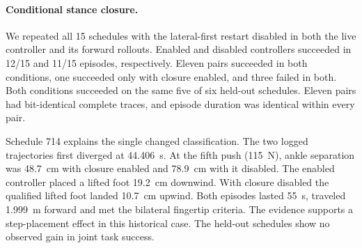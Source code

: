 \paragraph{Conditional stance closure.}
We repeated all 15 schedules with the lateral-first restart disabled in both the live controller and its forward rollouts. Enabled and disabled controllers succeeded in 12/15 and 11/15 episodes, respectively. Eleven pairs succeeded in both conditions, one succeeded only with closure enabled, and three failed in both. Both conditions succeeded on the same five of six held-out schedules. Eleven pairs had bit-identical complete traces, and episode duration was identical within every pair.

Schedule 714 explains the single changed classification. The two logged trajectories first diverged at 44.406~s. At the fifth push (115~N), ankle separation was 48.7~cm with closure enabled and 78.9~cm with it disabled. The enabled controller placed a lifted foot 19.2~cm downwind. With closure disabled the qualified lifted foot landed 10.7~cm upwind. Both episodes lasted 55~s, traveled 1.999~m forward and met the bilateral fingertip criteria. The evidence supports a step-placement effect in this historical case. The held-out schedules show no observed gain in joint task success.
